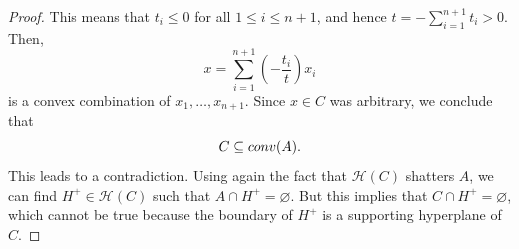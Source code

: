 \documentclass[10pt,a4paper]{amsart}
\newcommand{\ls}{\leqslant}
\begin{document}
\begin{proof}
This means that $t_i\ls 0$ for all $1\ls i\ls n+1$, and hence $t=-\sum_{i=1}^{n+1}t_i>0$. Then,
$$x=\sum_{i=1}^{n+1}\left(-\frac{t_i}{t}\right)x_i$$
is a convex combination of $x_1,\ldots ,x_{n+1}$. Since $x\in C$ was arbitrary, we conclude that
$$C\subseteq {\rm conv}(A).$$
This leads to a contradiction. Using again the fact that $\mathcal{H}(C)$ shatters $A$, we can find $H^+\in\mathcal{H}(C)$
such that $A\cap H^+=\varnothing$. But this implies that $C\cap H^+=\varnothing$, which cannot be true
because the boundary of $H^+$ is a supporting hyperplane of $C$.
\end{proof}
\end{document}
